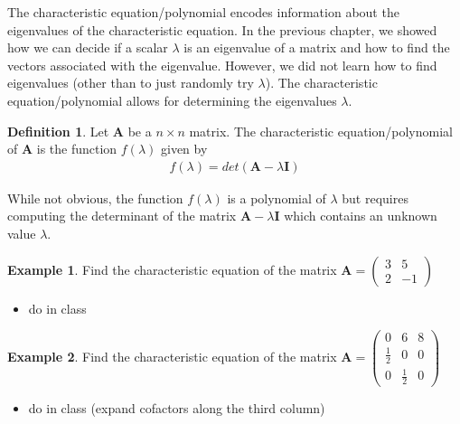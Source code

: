 \documentclass[
]{book}
\providecommand{\tightlist}{%
  \setlength{\itemsep}{0pt}\setlength{\parskip}{0pt}}
\theoremstyle{definition}
\newtheorem{definition}{Definition}[chapter]
\theoremstyle{definition}
\newtheorem{example}{Example}[chapter]
\theoremstyle{definition}
\theoremstyle{definition}
\theoremstyle{remark}
\begin{document}
The characteristic equation/polynomial encodes information about the eigenvalues of the characteristic equation. In the previous chapter, we showed how we can decide if a scalar \(\lambda\) is an eigenvalue of a matrix and how to find the vectors associated with the eigenvalue. However, we did not learn how to find eigenvalues (other than to just randomly try \(\lambda\)). The characteristic equation/polynomial allows for determining the eigenvalues \(\lambda\).

\begin{definition}
Let \(\mathbf{A}\) be a \(n \times n\) matrix. The characteristic equation/polynomial of \(\mathbf{A}\) is the function \(f(\lambda)\) given by
\[
\begin{aligned}
f(\lambda) = det(\mathbf{A} - \lambda \mathbf{I})
\end{aligned}
\]
\end{definition}

While not obvious, the function \(f(\lambda)\) is a polynomial of \(\lambda\) but requires computing the determinant of the matrix \(\mathbf{A} - \lambda \mathbf{I}\) which contains an unknown value \(\lambda\).

\begin{example}

Find the characteristic equation of the matrix \(\mathbf{A} = \begin{pmatrix} 3 & 5 \\ 2 & -1 \end{pmatrix}\)

\begin{itemize}
\tightlist
\item
  do in class
\end{itemize}

\end{example}

\begin{example}

Find the characteristic equation of the matrix \(\mathbf{A} = \begin{pmatrix} 0 & 6 & 8 \\ \frac{1}{2} & 0 & 0 \\ 0 & \frac{1}{2} & 0 \end{pmatrix}\)

\begin{itemize}
\tightlist
\item
  do in class (expand cofactors along the third column)
\end{itemize}

\end{example}
\end{document}
